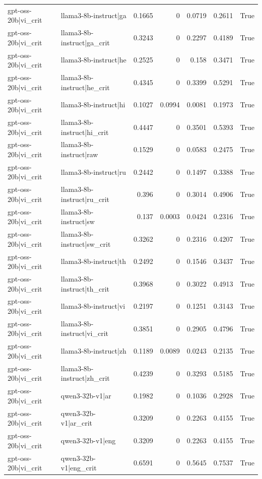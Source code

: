\begin{table}
\begin{tabular}{l l r r r r l}
gpt-oss-20b|vi_crit & llama3-8b-instruct|ga & 0.1665 & 0 & 0.0719 & 0.2611 & True \\
gpt-oss-20b|vi_crit & llama3-8b-instruct|ga_crit & 0.3243 & 0 & 0.2297 & 0.4189 & True \\
gpt-oss-20b|vi_crit & llama3-8b-instruct|he & 0.2525 & 0 & 0.158 & 0.3471 & True \\
gpt-oss-20b|vi_crit & llama3-8b-instruct|he_crit & 0.4345 & 0 & 0.3399 & 0.5291 & True \\
gpt-oss-20b|vi_crit & llama3-8b-instruct|hi & 0.1027 & 0.0994 & 0.0081 & 0.1973 & True \\
gpt-oss-20b|vi_crit & llama3-8b-instruct|hi_crit & 0.4447 & 0 & 0.3501 & 0.5393 & True \\
gpt-oss-20b|vi_crit & llama3-8b-instruct|raw & 0.1529 & 0 & 0.0583 & 0.2475 & True \\
gpt-oss-20b|vi_crit & llama3-8b-instruct|ru & 0.2442 & 0 & 0.1497 & 0.3388 & True \\
gpt-oss-20b|vi_crit & llama3-8b-instruct|ru_crit & 0.396 & 0 & 0.3014 & 0.4906 & True \\
gpt-oss-20b|vi_crit & llama3-8b-instruct|sw & 0.137 & 0.0003 & 0.0424 & 0.2316 & True \\
gpt-oss-20b|vi_crit & llama3-8b-instruct|sw_crit & 0.3262 & 0 & 0.2316 & 0.4207 & True \\
gpt-oss-20b|vi_crit & llama3-8b-instruct|th & 0.2492 & 0 & 0.1546 & 0.3437 & True \\
gpt-oss-20b|vi_crit & llama3-8b-instruct|th_crit & 0.3968 & 0 & 0.3022 & 0.4913 & True \\
gpt-oss-20b|vi_crit & llama3-8b-instruct|vi & 0.2197 & 0 & 0.1251 & 0.3143 & True \\
gpt-oss-20b|vi_crit & llama3-8b-instruct|vi_crit & 0.3851 & 0 & 0.2905 & 0.4796 & True \\
gpt-oss-20b|vi_crit & llama3-8b-instruct|zh & 0.1189 & 0.0089 & 0.0243 & 0.2135 & True \\
gpt-oss-20b|vi_crit & llama3-8b-instruct|zh_crit & 0.4239 & 0 & 0.3293 & 0.5185 & True \\
gpt-oss-20b|vi_crit & qwen3-32b-v1|ar & 0.1982 & 0 & 0.1036 & 0.2928 & True \\
gpt-oss-20b|vi_crit & qwen3-32b-v1|ar_crit & 0.3209 & 0 & 0.2263 & 0.4155 & True \\
gpt-oss-20b|vi_crit & qwen3-32b-v1|eng & 0.3209 & 0 & 0.2263 & 0.4155 & True \\
gpt-oss-20b|vi_crit & qwen3-32b-v1|eng_crit & 0.6591 & 0 & 0.5645 & 0.7537 & True \\

\end{tabular}
\end{table}
